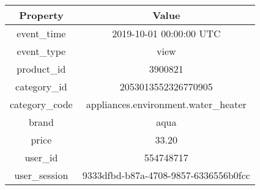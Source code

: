\begin{center}
    \begin{tabular}{ | c| c | } 
     \hline
     \textbf{Property} & \textbf{Value}  \\  
     \hline
     event\_time & 2019-10-01 00:00:00 UTC \\
     \hline
     event\_type & view \\
     \hline
     product\_id & 3900821 \\
     \hline
     category\_id & 2053013552326770905 \\
     \hline
     category\_code & appliances.environment.water\_heater \\
     \hline
     brand & aqua \\
     \hline
     price & 33.20 \\
     \hline
     user\_id & 554748717 \\
     \hline
     user\_session & 9333dfbd-b87a-4708-9857-6336556b0fcc \\
     \hline
    \end{tabular}
    \end{center}


